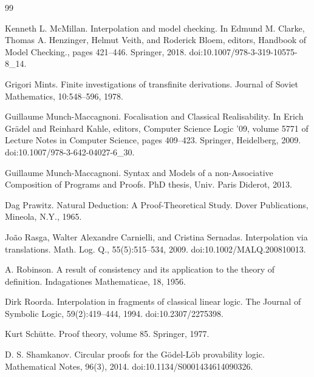 \documentclass[10pt,a4paper]{article}
\begin{document}
\begin{thebibliography}{99}
\par\noindent    Kenneth L. McMillan.  Interpolation and model checking.  In Edmund M. Clarke, Thomas A. Henzinger, Helmut Veith, and Roderick Bloem, editors, Handbook of Model Checking., pages 421–446. Springer, 2018.  doi:10.1007/978-3-319-10575-8\_14.  

\par\noindent    Grigori Mints.  Finite investigations of transfinite derivations.  Journal of Soviet Mathematics, 10:548–596, 1978.  

\par\noindent    Guillaume Munch-Maccagnoni.  Focalisation and Classical Realisability.  In Erich Grädel and Reinhard Kahle, editors, Computer Science Logic ’09, volume 5771 of Lecture Notes in Computer Science, pages 409–423. Springer, Heidelberg, 2009.  doi:10.1007/978-3-642-04027-6\_30.  

\par\noindent    Guillaume Munch-Maccagnoni.  Syntax and Models of a non-Associative Composition of Programs and Proofs.  PhD thesis, Univ. Paris Diderot, 2013.  

\par\noindent    Dag Prawitz.  Natural Deduction: A Proof-Theoretical Study.  Dover Publications, Mineola, N.Y., 1965.  

\par\noindent    João Rasga, Walter Alexandre Carnielli, and Cristina Sernadas.  Interpolation via translations.  Math. Log. Q., 55(5):515–534, 2009.  doi:10.1002/MALQ.200810013.  

\par\noindent    A. Robinson.  A result of consistency and its application to the theory of definition.  Indagationes Mathematicae, 18, 1956.  

\par\noindent    Dirk Roorda.  Interpolation in fragments of classical linear logic.  The Journal of Symbolic Logic, 59(2):419–444, 1994.  doi:10.2307/2275398.  

\par\noindent    Kurt Schütte.  Proof theory, volume 85.  Springer, 1977.  

\par\noindent    D. S. Shamkanov.  Circular proofs for the Gödel-Löb provability logic.  Mathematical Notes, 96(3), 2014.  doi:10.1134/S0001434614090326.  


\end{thebibliography}
\end{document}

